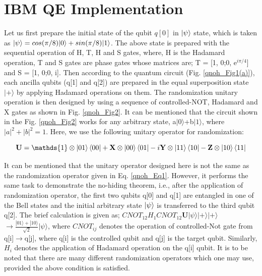 \section{IBM QE Implementation}
    
Let us first prepare the initial state of the qubit $q[0]$ in $\ket{\psi}$ state, which is taken as $\ket{\psi}=cos(\pi/8)|0\rangle+sin(\pi/8)|1\rangle$. The above state is prepared with the sequential operation of H, T, H and S gates, where, H is the Hadamard operation, T and S gates are phase gates whose matrices are; T = [1, 0;0, e$^{i\pi/4}$] and S = [1, 0;0, i]. Then according to the quantum circuit (Fig. \ref{qnoh_Fig1(a)}), each ancilla qubits (q[1] and q[2]) are prepared in the equal superposition state $|+\rangle$ by applying Hadamard operations on them. The randomization unitary operation is then designed by using a sequence of controlled-NOT, Hadamard and X gates as shown in Fig. \ref{qnoh_Fig2}. It can be mentioned that the circuit shown in the Fig. \ref{qnoh_Fig2} works for any arbitrary state, a$|0\rangle$+b$|1\rangle$, where $|a|^2+|b|^2=1$. Here, we use the following unitary operator for randomization: 

\begin{equation}\label{qnoh_Eq2}
    \mathbf{U} =  \mathds{1} \otimes \ket{01}\bra{00} + \mathbf{X} \otimes \ket{00}\bra{01} - i \mathbf{Y}\otimes \ket{11}\bra{10}-\mathbf{Z}\otimes \ket{10}\bra{11}
\end{equation} 

It can be mentioned that the unitary operator designed here is not the same as the randomization operator given in Eq. \eqref{qnoh_Eq1}. However, it performs the same task to demonstrate the no-hiding theorem, i.e., after the application of randomization operator, the first two qubits 
q[0] and q[1] are entangled in one of the Bell states and the initial arbitrary state $\ket{\psi}$ is transferred to the third qubit q[2]. The brief calculation is given as; $CNOT_{12}H_{1}CNOT_{12}\mathbf{U}|\psi\rangle|+\rangle|+\rangle$ $\rightarrow \frac{|01\rangle+|10\rangle}{\sqrt{2}}|\psi\rangle$, where $CNOT_{ij}$ denotes the operation of controlled-Not gate from q[i]$\rightarrow$q[j], where q[i] is the controlled qubit and q[j] is the target qubit. Similarly, $H_{i}$ denotes the application of Hadamard operation on the q[i] qubit. It is to be noted that there are many different randomization operators which one may use, provided the above condition is satisfied. 

